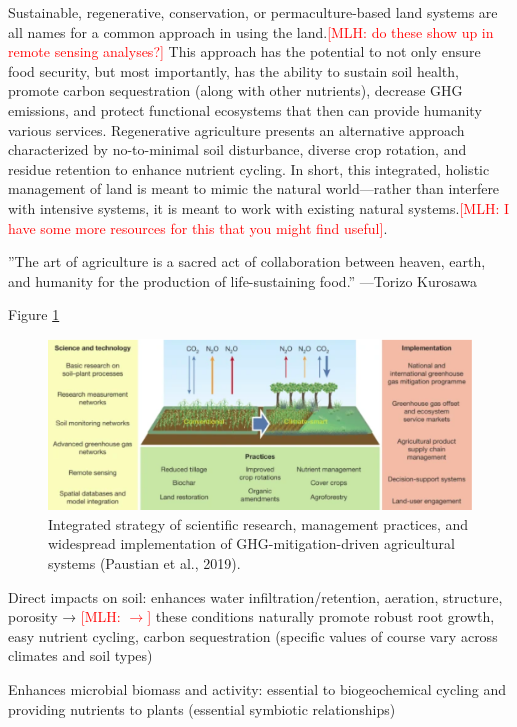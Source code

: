 \documentclass{book}\usepackage{knitr}
\newcommand{\red}[1]{\textcolor{red}{[MLH: #1]}}
\begin{document}
\begin{knitrout}
\begin{kframe}
Sustainable, regenerative, conservation, or permaculture-based land systems are all names for a common approach in using the land.\red{do these show up in remote sensing analyses?} This approach has the potential to not only ensure food security, but most importantly, has the ability to sustain soil health, promote carbon sequestration (along with other nutrients), decrease GHG emissions, and protect functional ecosystems that then can provide humanity various services. Regenerative agriculture presents an alternative approach characterized by no-to-minimal soil disturbance, diverse crop rotation, and residue retention to enhance nutrient cycling. In short, this integrated, holistic management of land is meant to mimic the natural world—rather than interfere with intensive systems, it is meant to work with existing natural systems.\red{I have some more resources for this that you might find useful}.

''The art of agriculture is a sacred act of collaboration between heaven, earth, and humanity for the production of life-sustaining food.'' —Torizo Kurosawa

Figure \ref{fig:Climate-Smart-Soils}

\begin{figure}
\includegraphics[width=\linewidth]{images/land-use/Climate-Smart-Soils.png}
\caption{Integrated strategy of scientific research, management practices, and widespread implementation of GHG-mitigation-driven agricultural systems (Paustian et al., 2019).}
\label{fig:Climate-Smart-Soils}
\end{figure}

Direct impacts on soil: enhances water infiltration/retention, aeration, structure, porosity → \red{$\rightarrow$} these conditions naturally promote robust root growth, easy nutrient cycling, carbon sequestration (specific values of course vary across climates and soil types)

Enhances microbial biomass and activity: essential to biogeochemical cycling and providing nutrients to plants (essential symbiotic relationships)


\end{kframe}
\end{knitrout}
\end{document}
